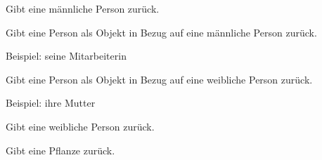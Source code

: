 \documentclass[a4paper,12pt,oneside]{sphinxmanual}
\begin{document}

\begin{fulllineitems}
\label{module:pyzufall.generator.person_m}
Gibt eine männliche Person zurück.

\end{fulllineitems}


\begin{fulllineitems}
\label{module:pyzufall.generator.person_objekt_m}
Gibt eine Person als Objekt in Bezug auf eine männliche Person zurück.

Beispiel: seine Mitarbeiterin

\end{fulllineitems}


\begin{fulllineitems}
\label{module:pyzufall.generator.person_objekt_w}
Gibt eine Person als Objekt in Bezug auf eine weibliche Person zurück.

Beispiel: ihre Mutter

\end{fulllineitems}


\begin{fulllineitems}
\label{module:pyzufall.generator.person_w}
Gibt eine weibliche Person zurück.

\end{fulllineitems}


\begin{fulllineitems}
\label{module:pyzufall.generator.pflanze}
Gibt eine Pflanze zurück.

\end{fulllineitems}

\end{document}
